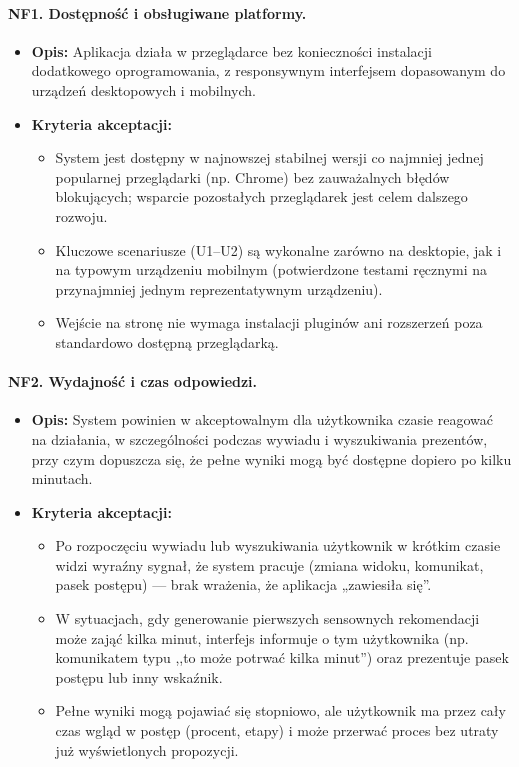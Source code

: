 \documentclass[12pt,a4paper]{article}
\begin{document}
\paragraph{NF1. Dostępność i obsługiwane platformy.}
\begin{itemize}
    \item \textbf{Opis:} Aplikacja działa w przeglądarce bez konieczności instalacji dodatkowego oprogramowania, z responsywnym interfejsem dopasowanym do urządzeń desktopowych i mobilnych.
    \item \textbf{Kryteria akceptacji:}
    \begin{itemize}
        \item System jest dostępny w najnowszej stabilnej wersji co najmniej jednej popularnej przeglądarki (np. Chrome) bez zauważalnych błędów blokujących; wsparcie pozostałych przeglądarek jest celem dalszego rozwoju.
        \item Kluczowe scenariusze (U1--U2) są wykonalne zarówno na desktopie, jak i na typowym urządzeniu mobilnym (potwierdzone testami ręcznymi na przynajmniej jednym reprezentatywnym urządzeniu).
        \item Wejście na stronę nie wymaga instalacji pluginów ani rozszerzeń poza standardowo dostępną przeglądarką.
    \end{itemize}
\end{itemize}

\paragraph{NF2. Wydajność i czas odpowiedzi.}
\begin{itemize}
    \item \textbf{Opis:} System powinien w akceptowalnym dla użytkownika czasie reagować na działania, w szczególności podczas wywiadu i wyszukiwania prezentów, przy czym dopuszcza się, że pełne wyniki mogą być dostępne dopiero po kilku minutach.
    \item \textbf{Kryteria akceptacji:}
    \begin{itemize}
        \item Po rozpoczęciu wywiadu lub wyszukiwania użytkownik w krótkim czasie widzi wyraźny sygnał, że system pracuje (zmiana widoku, komunikat, pasek postępu) — brak wrażenia, że aplikacja „zawiesiła się”.
        \item W sytuacjach, gdy generowanie pierwszych sensownych rekomendacji może zająć kilka minut, interfejs informuje o tym użytkownika (np. komunikatem typu ,,to może potrwać kilka minut'') oraz prezentuje pasek postępu lub inny wskaźnik.
        \item Pełne wyniki mogą pojawiać się stopniowo, ale użytkownik ma przez cały czas wgląd w postęp (procent, etapy) i może przerwać proces bez utraty już wyświetlonych propozycji.
    \end{itemize}
\end{itemize}
\end{document}
